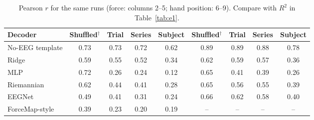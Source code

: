 \begin{table}[t]
\centering
\caption{Pearson $r$ for the same runs (force: columns 2--5; hand position: 6--9). Compare with $R^2$ in Table~\ref{tab:e1}.}
\label{tab:e1r}
\footnotesize
\setlength{\tabcolsep}{3pt}
\begin{tabular}{lcccccccc}
\toprule
Decoder & Shuffled$^\dagger$ & Trial & Series & Subject & Shuffled$^\dagger$ & Trial & Series & Subject \\
\midrule
No-EEG template & 0.73 & 0.73 & 0.72 & 0.62 & 0.89 & 0.89 & 0.88 & 0.78 \\
Ridge & 0.59 & 0.55 & 0.52 & 0.34 & 0.62 & 0.59 & 0.57 & 0.36 \\
MLP & 0.72 & 0.26 & 0.24 & 0.12 & 0.65 & 0.41 & 0.39 & 0.26 \\
Riemannian & 0.62 & 0.44 & 0.41 & 0.28 & 0.65 & 0.56 & 0.55 & 0.39 \\
EEGNet & 0.49 & 0.41 & 0.31 & 0.24 & 0.66 & 0.62 & 0.58 & 0.40 \\
ForceMap-style & 0.39 & 0.23 & 0.20 & 0.19 & -- & -- & -- & -- \\
\bottomrule
\end{tabular}
\end{table}
